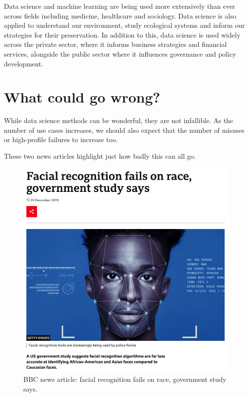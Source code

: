 \documentclass[
  letterpaper,
  DIV=11,
  numbers=noendperiod]{scrreprt}
\begin{document}
Data science and machine learning are being used more extensively than
ever across fields including medicine, healthcare and sociology. Data
science is also applied to understand our environment, study ecological
systems and inform our strategies for their preservation. In addition to
this, data science is used widely across the private sector, where it
informs business strategies and financial services, alongside the public
sector where it influences governance and policy development.

\section{What could go wrong?}\label{what-could-go-wrong}

While data science methods can be wonderful, they are not infallible. As
the number of use cases increases, we should also expect that the number
of misuses or high-profile failures to increase too.

These two news articles highlight just how badly this can all go.

\begin{figure}[H]

{\centering \includegraphics{images/503-ethics-conduct/bbc-facial-recognition.png}

}

\caption{BBC news article: facial recognition fails on race, government
study says.}

\end{figure}%
\end{document}
